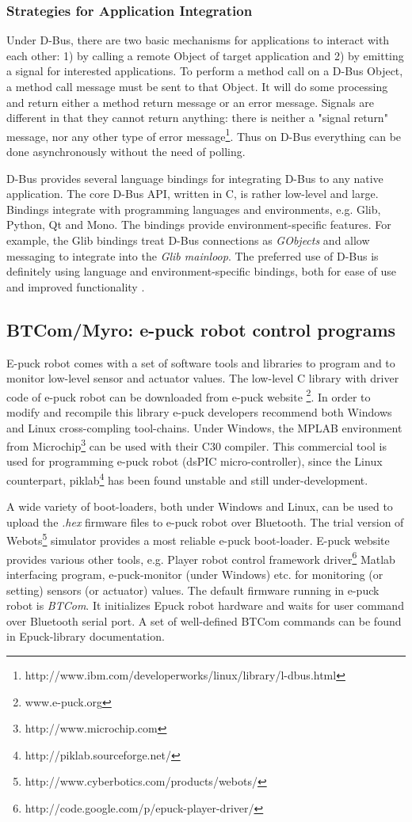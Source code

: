 \subsubsection*{Strategies for Application Integration}
Under D-Bus, there are two basic mechanisms for applications to interact with each other: 1) by calling a remote Object of target application and 2) by emitting a signal for interested applications. To perform a method call on a D-Bus Object, a method call message must be sent to that Object. It will do some processing and return either a method return message or an error message. Signals are different in that they cannot return anything: there is neither a "signal return" message, nor any other type of error message\footnote{http://www.ibm.com/developerworks/linux/library/l-dbus.html}. Thus on D-Bus everything can be done asynchronously without the need of polling.

D-Bus provides several language bindings for integrating D-Bus to any native application. The core D-Bus API, written in C, is rather low-level and large. Bindings integrate with programming languages and environments, e.g. Glib, Python, Qt and Mono. The bindings provide environment-specific features. For example, the Glib bindings treat D-Bus connections as {\em GObjects} and allow messaging to integrate into the {\em Glib mainloop}. The preferred use of D-Bus is definitely using language and environment-specific bindings, both for ease of use and improved functionality \cite{Love2005}.
\subsection{BTCom/Myro: e-puck robot control programs}
\label{expt-tools:btcom}
E-puck robot comes with a set of software tools and libraries to program and to monitor low-level sensor and actuator values. The low-level C library with driver code of e-puck robot can be downloaded from e-puck website \footnote{www.e-puck.org}. In order to modify and recompile this library e-puck developers recommend both Windows and Linux cross-compling tool-chains. Under Windows, the MPLAB environment from Microchip\footnote{http://www.microchip.com} can be used with their C30 compiler. This commercial tool is used for programming e-puck robot (dsPIC micro-controller), since the Linux counterpart, piklab\footnote{http://piklab.sourceforge.net/} has been found unstable and still under-development. 

A wide variety of boot-loaders, both under Windows and Linux, can be used to upload the {\em .hex} firmware files to e-puck robot over Bluetooth.  The trial version of Webots\footnote{http://www.cyberbotics.com/products/webots/} simulator provides a most reliable e-puck boot-loader. E-puck website provides various other tools, e.g. Player robot control framework driver\footnote{http://code.google.com/p/epuck-player-driver/} Matlab interfacing program, e-puck-monitor (under Windows) etc. for monitoring (or setting) sensors (or actuator) values. The default firmware running in e-puck robot is {\em BTCom}. It initializes Epuck robot hardware and waits for user command over Bluetooth serial port. A set of well-defined BTCom commands can be found in Epuck-library documentation. 

